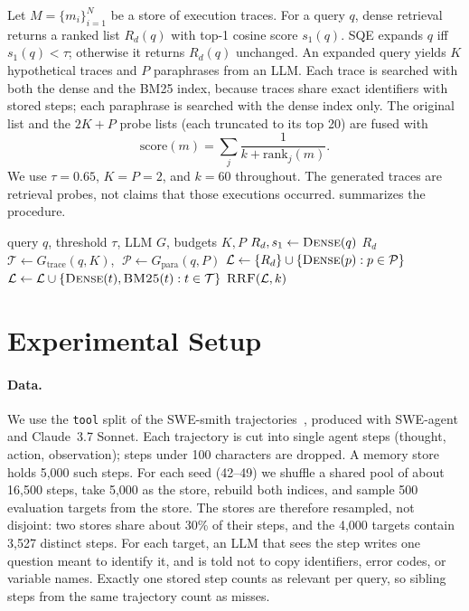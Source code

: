 \documentclass{article}
\newcommand{\sqe}{\textsc{SQE}}
\begin{document}
Let $M=\{m_i\}_{i=1}^{N}$ be a store of execution traces. For a query $q$,
dense retrieval returns a ranked list $R_d(q)$ with top-1 cosine score
$s_1(q)$. \sqe{} expands $q$ iff $s_1(q)<\tau$; otherwise it returns $R_d(q)$
unchanged. An expanded query yields $K$ hypothetical traces and $P$ paraphrases
from an LLM. Each trace is searched with both the dense and the BM25 index,
because traces share exact identifiers with stored steps; each paraphrase is
searched with the dense index only. The original list and the $2K+P$ probe lists
(each truncated to its top 20) are fused with
\begin{equation}
  \mathrm{score}(m)=\sum_{j}\frac{1}{k+\mathrm{rank}_j(m)}.
\end{equation}
We use $\tau=0.65$, $K=P=2$, and $k=60$ throughout. The generated traces are
retrieval probes, not claims that those executions occurred.
 summarizes the procedure.

\begin{algorithm}[t]
  \caption{Selective Query-Side Expansion}
  \label{alg:sqe}
  \begin{algorithmic}
     query $q$, threshold $\tau$, LLM $G$, budgets $K,P$
    \STATE $R_d, s_1 \leftarrow \textsc{Dense}(q)$
       $R_d$
    \ENDIF
    \STATE $\mathcal{T} \leftarrow G_{\text{trace}}(q,K)$, $\;\mathcal{P} \leftarrow G_{\text{para}}(q,P)$
    \STATE $\mathcal{L} \leftarrow \{R_d\} \cup \{\textsc{Dense}(p) : p \in \mathcal{P}\}$
    \STATE $\mathcal{L} \leftarrow \mathcal{L} \cup \{\textsc{Dense}(t), \textsc{BM25}(t) : t \in \mathcal{T}\}$
     $\textsc{RRF}(\mathcal{L}, k)$
  \end{algorithmic}
\end{algorithm}

\section{Experimental Setup}
\label{sec:setup}

\paragraph{Data.} We use the \texttt{tool} split of the SWE-smith
trajectories~\cite{yang2025swesmith}, produced with SWE-agent and Claude~3.7
Sonnet. Each trajectory is cut into single agent steps (thought, action,
observation); steps under 100 characters are dropped. A memory store holds
5,000 such steps. For each seed (42--49) we shuffle a shared pool of about
16,500 steps, take 5,000 as the store, rebuild both indices, and sample 500
evaluation targets from the store. The stores are therefore resampled, not
disjoint: two stores share about 30\% of their steps, and the 4,000 targets
contain 3,527 distinct steps. For each target, an LLM that sees the step writes
one question meant to identify it, and is told not to copy identifiers, error
codes, or variable names. Exactly one stored step counts as relevant per query,
so sibling steps from the same trajectory count as misses.
\end{document}
